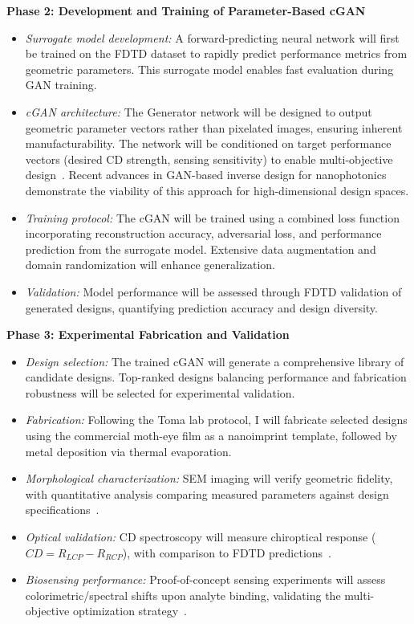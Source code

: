 \documentclass[12pt,a4paper]{article}
\begin{document}
\textbf{Phase 2: Development and Training of Parameter-Based cGAN}

\begin{itemize}
  \item \textit{Surrogate model development:} A forward-predicting neural network will first be trained on the FDTD dataset to rapidly predict performance metrics from geometric parameters. This surrogate model enables fast evaluation during GAN training.
  \item \textit{cGAN architecture:} The Generator network will be designed to output geometric parameter vectors rather than pixelated images, ensuring inherent manufacturability. The network will be conditioned on target performance vectors (desired CD strength, sensing sensitivity) to enable multi-objective design~\cite{benchmark_dl_inverse,conditional_gan_nanophotonics}. Recent advances in GAN-based inverse design for nanophotonics~\cite{conditional_gan_nanophotonics,generative_metasurface_umbc} demonstrate the viability of this approach for high-dimensional design spaces.
  \item \textit{Training protocol:} The cGAN will be trained using a combined loss function incorporating reconstruction accuracy, adversarial loss, and performance prediction from the surrogate model. Extensive data augmentation and domain randomization will enhance generalization.
  \item \textit{Validation:} Model performance will be assessed through FDTD validation of generated designs, quantifying prediction accuracy and design diversity.
\end{itemize}

\textbf{Phase 3: Experimental Fabrication and Validation}

\begin{itemize}
  \item \textit{Design selection:} The trained cGAN will generate a comprehensive library of candidate designs. Top-ranked designs balancing performance and fabrication robustness will be selected for experimental validation.
  \item \textit{Fabrication:} Following the Toma lab protocol, I will fabricate selected designs using the commercial moth-eye film as a nanoimprint template, followed by metal deposition via thermal evaporation.
  \item \textit{Morphological characterization:} SEM imaging will verify geometric fidelity, with quantitative analysis comparing measured parameters against design specifications~\cite{cv_zheng}.
  \item \textit{Optical validation:} CD spectroscopy will measure chiroptical response ($CD = R_{LCP} - R_{RCP}$), with comparison to FDTD predictions~\cite{nn_chiral_nanodimer}.
  \item \textit{Biosensing performance:} Proof-of-concept sensing experiments will assess colorimetric/spectral shifts upon analyte binding, validating the multi-objective optimization strategy~\cite{dl_nanophotonics_rg}.
\end{itemize}
\end{document}
